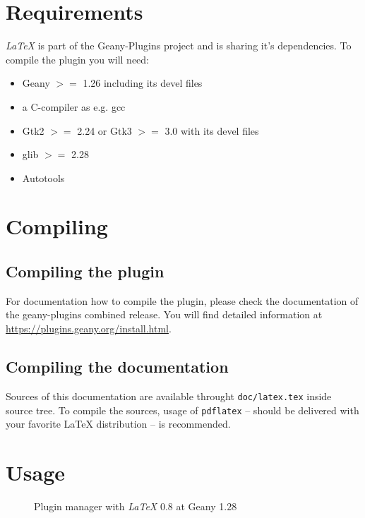 \documentclass[%
paper=a4,%
fontsize=11pt,%
twoside=false,%
DIV18,%
headsepline,%
plainheadsepline,%
footsepline,%
plainfootsepline,%
bibliography=totoc,%
listof=totoc,%
BCOR10mm,%
parskip=half,%
openany,%
]{scrreprt}
\begin{document}
\newpage{}

\section{Requirements}

\textit{LaTeX} is part of the Geany-Plugins project and is sharing it's
dependencies. To compile the plugin you will need:
\begin{itemize}
    \item Geany $>=$ 1.26 including its devel files
    \item a C-compiler as e.g. gcc
    \item Gtk2 $>=$ 2.24 or Gtk3 $>=$ 3.0 with its devel files
    \item glib $>=$ 2.28
    \item Autotools
\end{itemize}

\section{Compiling}
\subsection{Compiling the plugin}
For documentation how to compile the plugin, please check the
documentation of the geany-plugins combined release. You will find detailed information at \url{https://plugins.geany.org/install.html}.

\subsection{Compiling the documentation}
\label{sec:compiling_of_documentation}
Sources of this documentation are available throught
\texttt{doc/latex.tex} inside source tree. To compile the sources,
usage of \texttt{pdflatex} -- should be delivered with your favorite
\LaTeX{} distribution -- is recommended.

\newpage{}

\section{Usage}
\begin{figure}[h!]
    \caption{Plugin manager with \textit{LaTeX} 0.8 at Geany 1.28}
    \label{img:geany_plugin_manager}
\end{figure}
\end{document}
